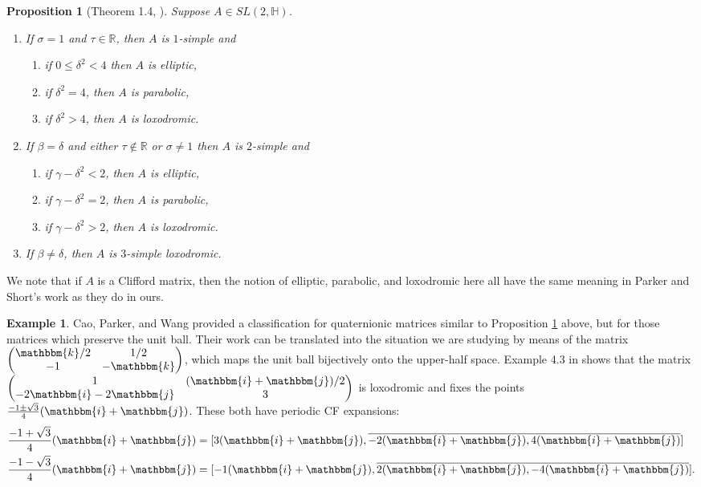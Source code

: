 \documentclass[reqno,10pt]{amsart}
\newcommand{\ii}{\mathbbm{i}}
\newcommand{\R}{\mathbb{R}}
\newcommand{\kk}{\mathbbm{k}}
\newcommand{\jj}{\mathbbm{j}}
\newtheorem{prop}[thm]{Proposition}
\numberwithin{thm}{section}
\theoremstyle{definition}
\theoremstyle{definition}
\newtheorem{example}[thm]{Example}
\numberwithin{equation}{section}
\begin{document}
\begin{prop}[Theorem 1.4, \cite{parker2009conjugacy}]\label{prop:parker}
Suppose $A\in SL(2,\mathbb{H})$.
\begin{enumerate}
\item If $\sigma=1$ and $\tau\in \mathbb{R}$, then $A$ is $1$-simple and 
\begin{enumerate}
\item if $0\le \delta^2<4$ then $A$ is elliptic,
\item if $\delta^2=4$, then $A$ is parabolic,
\item if $\delta^2>4$, then $A$ is loxodromic.
\end{enumerate}
\item If $\beta=\delta$ and either $\tau\not\in \R$ or $\sigma\neq 1$ then $A$ is $2$-simple and
\begin{enumerate}
\item if $\gamma-\delta^2<2$, then $A$ is elliptic,
\item if $\gamma-\delta^2=2$, then $A$ is parabolic,
\item if $\gamma-\delta^2>2$, then $A$ is loxodromic.
\end{enumerate}
\item If $\beta\neq \delta$, then $A$ is $3$-simple loxodromic.
\end{enumerate}
\end{prop}

We note that if $A$ is a Clifford matrix, then the notion of elliptic, parabolic, and loxodromic here all have the same meaning in Parker and Short's work as they do in ours. 



\begin{example}Cao, Parker, and Wang \cite{cao2004classification} provided a classification for quaternionic matrices similar to Proposition \ref{prop:parker} above, but for those matrices which preserve the unit ball. Their work can be translated into the situation we are studying by means of the matrix $\begin{pmatrix}\kk/2 & 1/2 \\ -1 & -\kk \end{pmatrix}$, which maps the unit ball bijectively onto the upper-half space. Example 4.3 in \cite{cao2004classification} shows that the matrix $\begin{pmatrix}1 & (\ii+\jj)/2\\ -2\ii-2\jj & 3 \end{pmatrix}$ is loxodromic and fixes the points $\frac{-1\pm \sqrt{3}}{4} (\ii+\jj)$. These both have periodic CF expansions:
\begin{align*}
\frac{-1+\sqrt{3}}{4}(\ii+\jj)&= [3(\ii+\jj),\overline{-2(\ii+\jj),4(\ii+\jj)}]\\
\frac{-1-\sqrt{3}}{4}(\ii+\jj)&= [-1(\ii+\jj),\overline{2(\ii+\jj),-4(\ii+\jj)}].
\end{align*}
\end{example}
\end{document}
